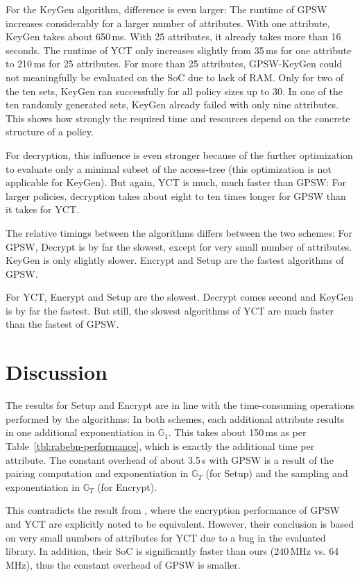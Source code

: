 For the KeyGen algorithm, difference is even larger:
The runtime of GPSW increases considerably for a larger number of attributes.
With one attribute, KeyGen takes about 650\,ms. With 25 attributes, it already takes more than 16 seconds.
The runtime of YCT only increases slightly from 35\,ms for one attribute to 210\,ms for 25 attributes.
For more than 25 attributes, GPSW-KeyGen could not meaningfully be evaluated on the SoC due to lack of RAM.
Only for two of the ten sets, KeyGen ran successfully for all policy sizes up to 30.
In one of the ten randomly generated sets, KeyGen already failed with only nine attributes.
This shows how strongly the required time and resources depend on the concrete structure of a policy.

For decryption, this influence is even stronger because of the further optimization to evaluate only a minimal subset of the \gls{access-tree} (this optimization is not applicable for KeyGen).
But again, YCT is much, much faster than GPSW: For larger policies, decryption takes about eight to ten times longer for GPSW than it takes for YCT.

The relative timings between the algorithms differs between the two schemes:
For GPSW, Decrypt is by far the slowest, except for very small number of attributes. KeyGen is only slightly slower.
Encrypt and Setup are the fastest algorithms of GPSW.

For YCT, Encrypt and Setup are the slowest.
Decrypt comes second and KeyGen is by far the fastest.
But still, the slowest algorithms of YCT are much faster than the fastest of GPSW.


\section{Discussion}
The results for Setup and Encrypt are in line with the time-consuming operations performed by the algorithms: 
In both schemes, each additional attribute results in one additional exponentiation in $\mathbb{G}_1$.
This takes about 150\,ms as per Table~\ref{tbl:rabebn-performance}, which is exactly the additional time per attribute.
The constant overhead of about 3.5\,s with GPSW is a result of the pairing computation and exponentiation in $\mathbb{G}_T$ (for Setup) and the sampling and exponentiation in $\mathbb{G}_T$ (for Encrypt).

This contradicts the result from \cite{girgenti_feasibility_2019}, where the encryption performance of GPSW and YCT are explicitly noted to be equivalent.
However, their conclusion is based on very small numbers of attributes for YCT due to a bug in the evaluated library.
In addition, their SoC is significantly faster than ours (240\,MHz vs. 64\,MHz), thus the constant overhead of GPSW is smaller.


